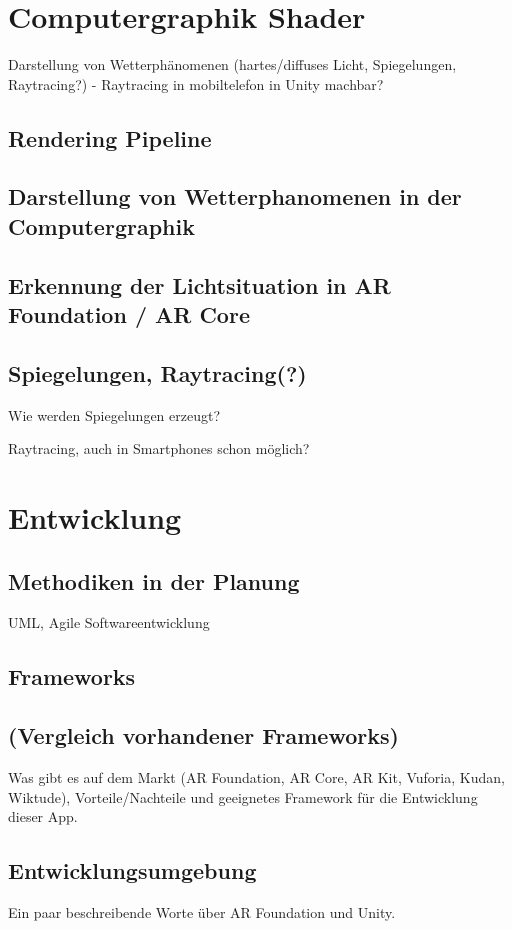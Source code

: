 \section{Computergraphik Shader}
Darstellung von Wetterphänomenen (hartes/diffuses Licht, Spiegelungen, Raytracing?)
- Raytracing in mobiltelefon in Unity machbar?
\subsection{Rendering Pipeline}
\subsection{Darstellung von Wetterphanomenen in der Computergraphik}
\subsection{Erkennung der Lichtsituation in AR Foundation / AR Core}
\subsection{Spiegelungen, Raytracing(?)}
Wie werden Spiegelungen erzeugt?

Raytracing, auch in Smartphones schon möglich?

\section{Entwicklung}
\subsection{Methodiken in der Planung}
UML, Agile Softwareentwicklung

\subsection{Frameworks}
\subsection{(Vergleich vorhandener Frameworks)}
Was gibt es auf dem Markt (AR Foundation, AR Core, AR Kit, Vuforia, Kudan, Wiktude), Vorteile/Nachteile und geeignetes Framework für die Entwicklung dieser App.
\subsection{Entwicklungsumgebung}
Ein paar beschreibende Worte über AR Foundation und Unity.

